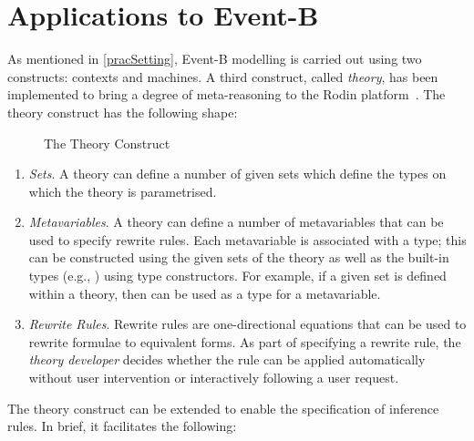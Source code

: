 \documentclass[copyright]{eptcs}
\begin{document}
\section{Applications to Event-B}\label{eapp}
As mentioned in \ref{pracSetting}, Event-B modelling is carried out using two constructs: contexts and machines. A third construct, called \textit{theory}, has been implemented to bring a degree of meta-reasoning to the Rodin platform~\cite{3056425}. The theory construct has the following shape:
\begin{figure}[ht]
\begin{center}
\end{center}
\caption{The Theory Construct}\label{thy}
\end{figure}
\begin{enumerate}
\item \textit{Sets}. A theory can define a number of given sets which define the types on which the theory is parametrised.
\item \textit{Metavariables}. A theory can define a number of metavariables that can be used to specify rewrite rules. Each metavariable is associated with a type; this can be constructed using the given sets of the theory as well as the built-in types (e.g., ) using type constructors. For example, if a given set  is defined within a theory, then  can be used as a type for a metavariable.
\item \textit{Rewrite Rules}. Rewrite rules are one-directional equations that can be used to rewrite formulae to equivalent forms. As part of specifying a rewrite rule, the \textit{theory developer} decides whether the rule can be applied automatically without user intervention or interactively following a user request.
\end{enumerate}
The theory construct can be extended to enable the specification of inference rules. In brief, it facilitates the following:
\end{document}
